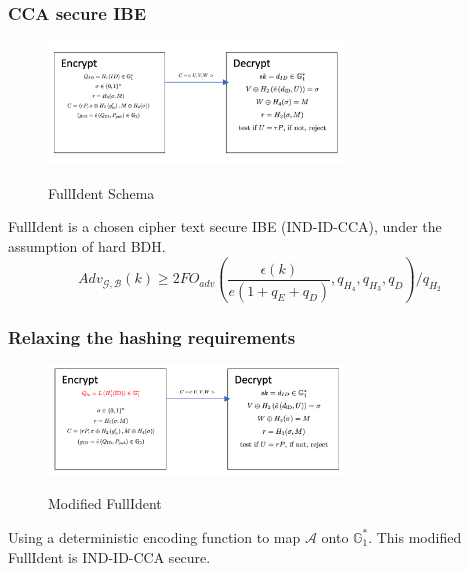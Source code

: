 \documentclass{beamer}
\begin{document}
\begin{frame}
	\frametitle{CCA secure IBE}
	\begin{figure}[]
		\centering
		\caption{FullIdent Schema}
		\includegraphics[width=0.7\textwidth]{figure/FullIdent.png}
		\label{}
	\end{figure}
FullIdent is a chosen cipher text secure IBE (IND-ID-CCA), under the assumption of hard BDH. \cite{barreto2002efficient,boneh1998decision}
$$A d v_{\mathcal{G}, \mathcal{B}}(k) \geq 2 F O_{a d v}\left(\frac{\epsilon(k)}{e\left(1+q_{E}+q_{D}\right)}, q_{H_{4}}, q_{H_{3}}, q_{D}\right) / q_{H_{2}}$$ 
\end{frame}

\begin{frame} 
	\frametitle{Relaxing the hashing requirements}
		\begin{figure}[]
			\centering
			\caption{Modified FullIdent}
			\includegraphics[width=0.7\textwidth]{figure/FullIdent2.png}
			\label{}
		\end{figure}
	Using a deterministic encoding function to map $\mathcal{A}$ onto $\mathbb{G}_1^*$. This modified FullIdent is IND-ID-CCA secure. \cite{boneh2001short}
\end{frame}




\end{document}
